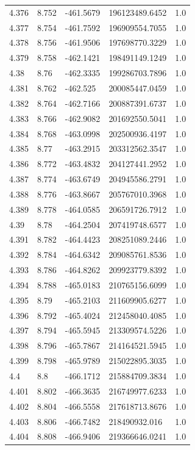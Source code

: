 \begin{tabular}{lllll}
4.376 & 8.752 & -461.5679 & 196123489.6452 & 1.0 \\
4.377 & 8.754 & -461.7592 & 196909554.7055 & 1.0 \\
4.378 & 8.756 & -461.9506 & 197698770.3229 & 1.0 \\
4.379 & 8.758 & -462.1421 & 198491149.1249 & 1.0 \\
4.38 & 8.76 & -462.3335 & 199286703.7896 & 1.0 \\
4.381 & 8.762 & -462.525 & 200085447.0459 & 1.0 \\
4.382 & 8.764 & -462.7166 & 200887391.6737 & 1.0 \\
4.383 & 8.766 & -462.9082 & 201692550.5041 & 1.0 \\
4.384 & 8.768 & -463.0998 & 202500936.4197 & 1.0 \\
4.385 & 8.77 & -463.2915 & 203312562.3547 & 1.0 \\
4.386 & 8.772 & -463.4832 & 204127441.2952 & 1.0 \\
4.387 & 8.774 & -463.6749 & 204945586.2791 & 1.0 \\
4.388 & 8.776 & -463.8667 & 205767010.3968 & 1.0 \\
4.389 & 8.778 & -464.0585 & 206591726.7912 & 1.0 \\
4.39 & 8.78 & -464.2504 & 207419748.6577 & 1.0 \\
4.391 & 8.782 & -464.4423 & 208251089.2446 & 1.0 \\
4.392 & 8.784 & -464.6342 & 209085761.8536 & 1.0 \\
4.393 & 8.786 & -464.8262 & 209923779.8392 & 1.0 \\
4.394 & 8.788 & -465.0183 & 210765156.6099 & 1.0 \\
4.395 & 8.79 & -465.2103 & 211609905.6277 & 1.0 \\
4.396 & 8.792 & -465.4024 & 212458040.4085 & 1.0 \\
4.397 & 8.794 & -465.5945 & 213309574.5226 & 1.0 \\
4.398 & 8.796 & -465.7867 & 214164521.5945 & 1.0 \\
4.399 & 8.798 & -465.9789 & 215022895.3035 & 1.0 \\
4.4 & 8.8 & -466.1712 & 215884709.3834 & 1.0 \\
4.401 & 8.802 & -466.3635 & 216749977.6233 & 1.0 \\
4.402 & 8.804 & -466.5558 & 217618713.8676 & 1.0 \\
4.403 & 8.806 & -466.7482 & 218490932.016 & 1.0 \\
4.404 & 8.808 & -466.9406 & 219366646.0241 & 1.0 \\

\end{tabular}
